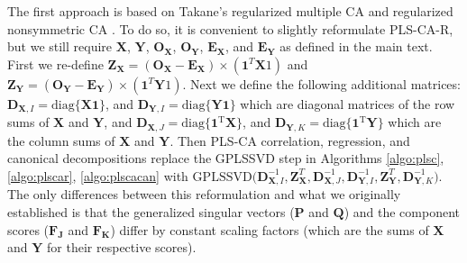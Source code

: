 \documentclass[12pt]{article}
\begin{document}
The first approach is based on Takane's regularized multiple CA
\citep{takane_regularized_2006} and regularized nonsymmetric CA
\citep{takane_regularized_2009-1}. To do so, it is convenient to
slightly reformulate PLS-CA-R, but we still require \({\mathbf X}\),
\({\mathbf Y}\), \({\mathbf O}_{\mathbf X}\),
\({\mathbf O}_{\mathbf Y}\), \({\mathbf E}_{\mathbf X}\), and
\({\mathbf E}_{\mathbf Y}\) as defined in the main text. First we
re-define
\({\mathbf Z}_{\mathbf X} = ({\mathbf O}_{\mathbf X} - {\mathbf E}_{\mathbf X}) \times (\mathbf{1}^{T}{\mathbf X1})\)
and
\({\mathbf Z}_{\mathbf Y} = ({\mathbf O}_{\mathbf Y} - {\mathbf E}_{\mathbf Y}) \times (\mathbf{1}^{T}{\mathbf Y1})\).
Next we define the following additional matrices:
\({\mathbf D}_{{\mathbf X},I} = \mathrm{diag\{ \mathbf{X1} \}}\), and
\({\mathbf D}_{{\mathbf Y},I} = \mathrm{diag\{ \mathbf{Y1} \}}\) which
are diagonal matrices of the row sums of \({\mathbf X}\) and
\({\mathbf Y}\), and
\({\mathbf D}_{{\mathbf X},J} = \mathrm{diag\{ \mathbf{1}^{T} \mathbf{X} \}}\),
and
\({\mathbf D}_{{\mathbf Y},K} = \mathrm{diag\{ \mathbf{1}^{T}\mathbf{Y} \}}\)
which are the column sums of \({\mathbf X}\) and \({\mathbf Y}\). Then
PLS-CA correlation, regression, and canonical decompositions replace the
GPLSSVD step in Algorithms \ref{algo:plsc}, \ref{algo:plscar},
\ref{algo:plscacan} with
\(\mathrm{GPLSSVD(}{\mathbf D}_{{\mathbf X},I}^{-1},{\mathbf Z}_{\mathbf X}^{T}, {\mathbf D}_{{\mathbf X},J}^{-1}, {\mathbf D}_{{\mathbf Y},I}^{-1},{\mathbf Z}_{\mathbf Y}^{T}, {\mathbf D}_{{\mathbf Y},K}^{-1} \mathrm{)}\).
The only differences between this reformulation and what we originally
established is that the generalized singular vectors (\({\mathbf P}\)
and \({\mathbf Q}\)) and the component scores
(\({\mathbf F}_{\mathbf J}\) and \({\mathbf F}_{\mathbf K}\)) differ by
constant scaling factors (which are the sums of \({\mathbf X}\) and
\({\mathbf Y}\) for their respective scores).
\end{document}
